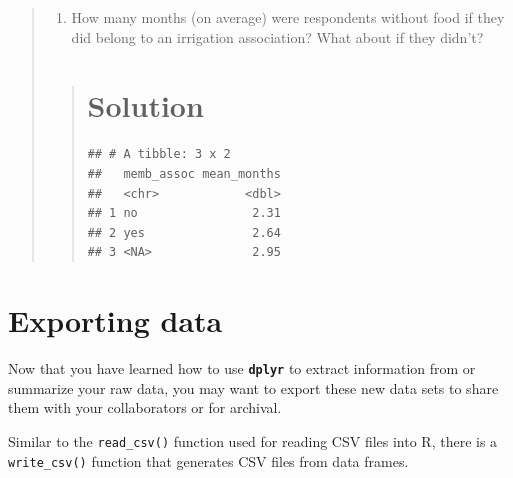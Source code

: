 \documentclass[]{book}
\newenvironment{Shaded}{\begin{snugshade}}{\end{snugshade}}
\newcommand{\KeywordTok}[1]{\textcolor[rgb]{0.13,0.29,0.53}{\textbf{#1}}}
\newcommand{\DataTypeTok}[1]{\textcolor[rgb]{0.13,0.29,0.53}{#1}}
\newcommand{\StringTok}[1]{\textcolor[rgb]{0.31,0.60,0.02}{#1}}
\newcommand{\OperatorTok}[1]{\textcolor[rgb]{0.81,0.36,0.00}{\textbf{#1}}}
\newcommand{\NormalTok}[1]{#1}
\providecommand{\tightlist}{%
  \setlength{\itemsep}{0pt}\setlength{\parskip}{0pt}}
\begin{document}
\begin{quote}
\begin{enumerate}
\def\labelenumi{\arabic{enumi}.}
\setcounter{enumi}{1}
\tightlist
\item
  How many months (on average) were respondents without food if they did
  belong to an irrigation association? What about if they didn't?
\end{enumerate}

\begin{quote}
\section{Solution}\label{solution-12}

\begin{Shaded}
\end{Shaded}

\begin{verbatim}
## # A tibble: 3 x 2
##   memb_assoc mean_months
##   <chr>            <dbl>
## 1 no                2.31
## 2 yes               2.64
## 3 <NA>              2.95
\end{verbatim}
\end{quote}
\end{quote}

\section{Exporting data}\label{exporting-data}

Now that you have learned how to use \textbf{\texttt{dplyr}} to extract
information from or summarize your raw data, you may want to export
these new data sets to share them with your collaborators or for
archival.

Similar to the \texttt{read\_csv()} function used for reading CSV files
into R, there is a \texttt{write\_csv()} function that generates CSV
files from data frames.
\end{document}
